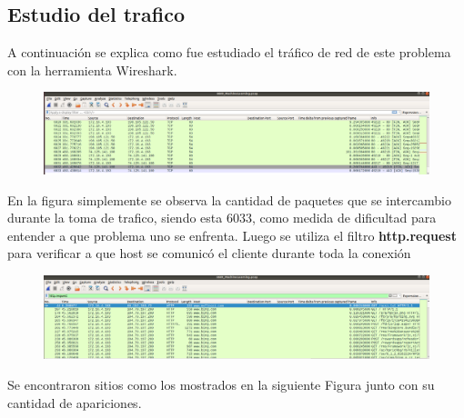 \documentclass[a4paper,10pt]{article}
\begin{document}
\subsection{Estudio del trafico}

A continuación se explica como fue estudiado el tráfico de red de este problema con la herramienta Wireshark.

\begin{figure}[!htp]
\centering
\includegraphics[scale=0.2]{Wireshark/1.png} 
\caption{}
\end{figure}

En la figura simplemente se observa la cantidad de paquetes que se intercambio durante la toma de trafico, siendo esta 6033, como medida de dificultad para entender a que problema uno se enfrenta.
Luego se utiliza el filtro \textbf{http.request} para verificar a que host se comunicó el cliente durante toda la conexión

\newpage

\medskip
\begin{figure}[!htp]
\centering
\includegraphics[scale=0.2]{Wireshark/2_1.png} 
\caption{}
\end{figure}

\medskip
Se encontraron sitios como los mostrados en la siguiente Figura junto con su cantidad de apariciones.
\end{document}
